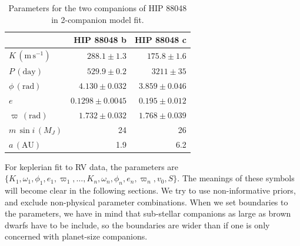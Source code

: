 \documentclass[letterpaper, preprint]{aastex}
\newcommand{\unit}[1]{\mathrm{#1}}
\begin{document}
\begin{table}
\centering
\begin{tabular}{lrr}
\hline
 & HIP 88048 b & HIP 88048 c \\
\hline
$K\,(\unit{m}\,\unit{s}^{-1})$ & $288.1\pm1.3$ & $175.8\pm 1.6$ \\
$P\,(\unit{day})$ & $529.9\pm0.2$ & $3211\pm 35$ \\
$\phi\,(\unit{rad})$ & $4.130\pm0.032$ & $3.859\pm0.046$ \\
$e$ & $ 0.1298 \pm 0.0045$ & $ 0.195 \pm 0.012$ \\
$\varpi\,(\unit{rad})$ & $1.732\pm0.032$ & $1.768\pm 0.039$ \\
$m\,\sin{i}\,(M_J)$ & 24 & 26\\
$a\,(\unit{AU})$ & 1.9 & 6.2\\
\hline
\end{tabular}
\begin{center}
\caption{Parameters for the two companions of HIP 88048 in 2-companion model fit.\label{tab:282param}}
\end{center}
\end{table}

For keplerian fit to RV data, the parameters are $\{K_1,\omega_1,\phi_1,e_1,\varpi_1,\ldots,K_n,\omega_n,\phi_n,e_n,\varpi_n,v_0,S\}$. The meanings of these symbols will become clear in the following sections. We try to use non-informative priors, and exclude non-physical parameter combinations. When we set boundaries to the parameters, we have in mind that sub-stellar companions as large as brown dwarfs have to be include, so the boundaries are wider than if one is only concerned with planet-size companions. 
\end{document}
